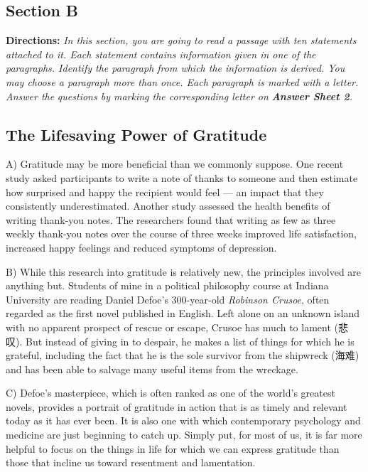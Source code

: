 \documentclass[UTF8,11pt]{ctexart}
\begin{document}
\subsection*{\textbf{Section B}}


\textbf{Directions:} \textit{In this section, you are going to read a passage with ten statements attached to it. Each statement} \textit{contains information given in one of the paragraphs. Identify the paragraph from which the information is} \textit{derived. You may choose a paragraph more than once. Each paragraph is marked with a letter. Answer the} \textit{questions by marking the corresponding letter on }\textbf{\textit{Answer Sheet 2}}\textit{.}


\subsection*{\textbf{The Lifesaving Power of Gratitude}}


A) Gratitude may be more beneficial than we commonly suppose. One recent study asked participants to write a note of thanks to someone and then estimate how surprised and happy the recipient would feel — an impact that they consistently underestimated. Another study assessed the health benefits of writing thank-you notes. The researchers found that writing as few as three weekly thank-you notes over the course of three weeks improved life satisfaction, increased happy feelings and reduced symptoms of depression.


B) While this research into gratitude is relatively new, the principles involved are anything but. Students of mine in a political philosophy course at Indiana University are reading Daniel Defoe’s 300-year-old \textit{Robinson Crusoe}, often regarded as the first novel published in English. Left alone on an unknown island with no apparent prospect of rescue or escape, Crusoe has much to lament (悲叹). But instead of giving in to despair, he makes a list of things for which he is grateful, including the fact that he is the sole survivor from the shipwreck (海难) and has been able to salvage many useful items from the wreckage.


C) Defoe’s masterpiece, which is often ranked as one of the world’s greatest novels, provides a portrait of gratitude in action that is as timely and relevant today as it has ever been. It is also one with which contemporary psychology and medicine are just beginning to catch up. Simply put, for most of us, it is far more helpful to focus on the things in life for which we can express gratitude than those that incline us toward resentment and lamentation.
\end{document}

